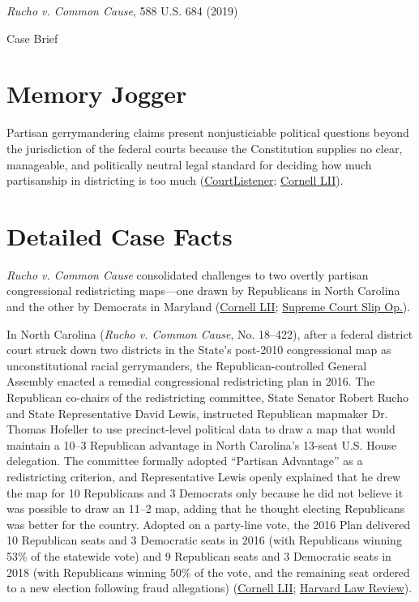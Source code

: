 \documentclass[12pt]{article}
\begin{document}
\begin{center}
{\LARGE \textit{Rucho v. Common Cause}, 588 U.S. 684 (2019)\par}
\vspace{0.8em}
{\large Case Brief\par}
\end{center}
\vspace{1em}

\section{Memory Jogger}

Partisan gerrymandering claims present nonjusticiable political questions beyond the jurisdiction of the federal courts because the Constitution supplies no clear, manageable, and politically neutral legal standard for deciding how much partisanship in districting is too much (\href{https://www.courtlistener.com/opinion/4633469/rucho-v-common-cause/}{CourtListener}; \href{https://www.law.cornell.edu/supremecourt/text/18-422}{Cornell LII}).

\section{Detailed Case Facts}

\textit{Rucho v. Common Cause} consolidated challenges to two overtly partisan congressional redistricting maps---one drawn by Republicans in North Carolina and the other by Democrats in Maryland (\href{https://www.law.cornell.edu/supremecourt/text/18-422}{Cornell LII}; \href{https://www.supremecourt.gov/opinions/18pdf/18-422_9ol1.pdf}{Supreme Court Slip Op.}).

In North Carolina (\textit{Rucho v. Common Cause}, No. 18--422), after a federal district court struck down two districts in the State's post-2010 congressional map as unconstitutional racial gerrymanders, the Republican-controlled General Assembly enacted a remedial congressional redistricting plan in 2016. The Republican co-chairs of the redistricting committee, State Senator Robert Rucho and State Representative David Lewis, instructed Republican mapmaker Dr. Thomas Hofeller to use precinct-level political data to draw a map that would maintain a 10--3 Republican advantage in North Carolina's 13-seat U.S. House delegation. The committee formally adopted ``Partisan Advantage'' as a redistricting criterion, and Representative Lewis openly explained that he drew the map for 10 Republicans and 3 Democrats only because he did not believe it was possible to draw an 11--2 map, adding that he thought electing Republicans was better for the country. Adopted on a party-line vote, the 2016 Plan delivered 10 Republican seats and 3 Democratic seats in 2016 (with Republicans winning 53\% of the statewide vote) and 9 Republican seats and 3 Democratic seats in 2018 (with Republicans winning 50\% of the vote, and the remaining seat ordered to a new election following fraud allegations) (\href{https://www.law.cornell.edu/supremecourt/text/18-422}{Cornell LII}; \href{https://harvardlawreview.org/print/vol-133/rucho-v-common-cause/}{Harvard Law Review}).
\end{document}
